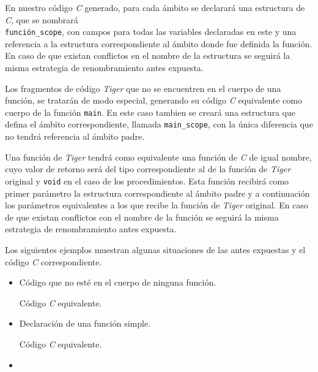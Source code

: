 \documentclass{article}
\begin{document}
En nuestro código \textit{C} generado, para cada ámbito se declarará una
estructura de \textit{C}, que se nombrará \\ \texttt{función\_scope}, con
campos para todas las variables declaradas en este y una referencia a la
estructura correspondiente al ámbito donde fue definida la función. En caso de
que existan conflictos en el nombre de la estructura se seguirá la misma
estrategia de renombramiento antes expuesta.

Los fragmentos de código \textit{Tiger} que no se encuentren en el
cuerpo de una función, se tratarán de modo especial, generando su
código \textit{C} equivalente como cuerpo de la función \texttt{main}. En este
caso tambien se creará una estructura que defina el ámbito correspondiente,
llamada \texttt{main\_scope}, con la única diferencia que no tendrá referencia
al ámbito padre.

Una función de \textit{Tiger} tendrá como equivalente una función de \textit{C}
de igual nombre, cuyo valor de retorno será del tipo correspondiente al de la
función de \textit{Tiger} original y \texttt{void} en el caso de los
procedimientos. Esta función recibirá como primer parámetro la estructura
correspondiente al ámbito padre y a continuación los parámetros equivalentes a
los que recibe la función de \textit{Tiger} original. En caso de que existan
conflictos con el nombre de la función se seguirá la misma estrategia de
renombramiento antes expuesta.

Los siguientes ejemplos muestran algunas situaciones de las antes expuestas y
el código \textit{C} correspondiente.

\begin{itemize}

    \item Código que no esté en el cuerpo de ninguna función.
    
    \begin{quote}
    
    \end{quote}

    Código \textit{C} equivalente.

    \begin{quote}
    
    \end{quote}

    \item Declaración de una función simple.
    
    \begin{quote}
    
    \end{quote}

    Código \textit{C} equivalente.

    \begin{quote}
    
    \end{quote}\item 

\end{itemize}
\end{document}
